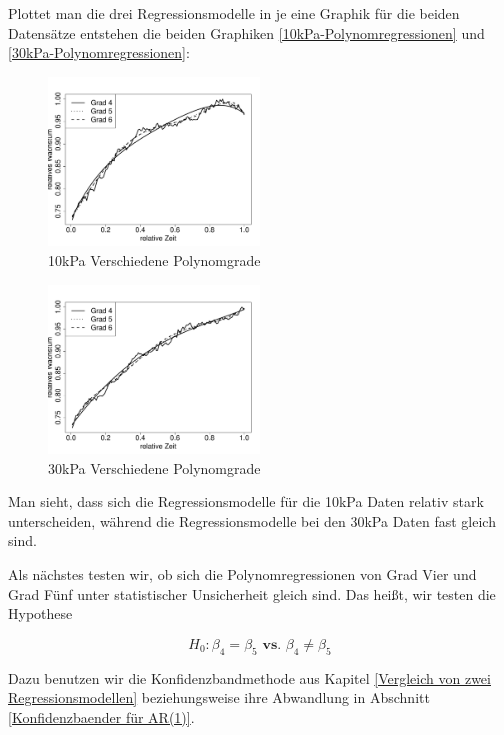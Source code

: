 \documentclass[12pt,a4paper]{article}
\theoremstyle{definition}
\theoremstyle{definition}
\theoremstyle{definition}
\theoremstyle{definition}
\begin{document}
Plottet man die drei Regressionsmodelle in je eine Graphik für die beiden Datensätze entstehen die beiden Graphiken \eqref{10kPa-Polynomregressionen} und \eqref{30kPa-Polynomregressionen}:

\begin{figure}[H] 
  \centering
     \includegraphics[width=0.5\textwidth]{10kPa-poly.pdf}
  \caption{10kPa Verschiedene Polynomgrade}
  \label{10kPa-Polynomregressionen}
\end{figure}


\begin{figure}[H] 
  \centering
     \includegraphics[width=0.5\textwidth]{30kPa-poly.pdf}
  \caption{30kPa Verschiedene Polynomgrade}
  \label{30kPa-Polynomregressionen}
\end{figure}

Man sieht, dass sich die Regressionsmodelle für die 10kPa Daten relativ stark unterscheiden, während die Regressionsmodelle bei den 30kPa Daten fast gleich sind.

Als nächstes testen wir, ob sich die Polynomregressionen von Grad Vier und Grad Fünf unter statistischer Unsicherheit gleich sind. Das heißt, wir testen die Hypothese

\begin{equation*}
H_0 : \beta_{4} = \beta_{5} \textbf{ vs. } \beta_4 \neq \beta_{5}
\end{equation*}

Dazu benutzen wir die Konfidenzbandmethode aus Kapitel \ref{Vergleich von zwei Regressionsmodellen} beziehungsweise ihre Abwandlung in Abschnitt \ref{Konfidenzbaender für AR(1)}.
\end{document}

